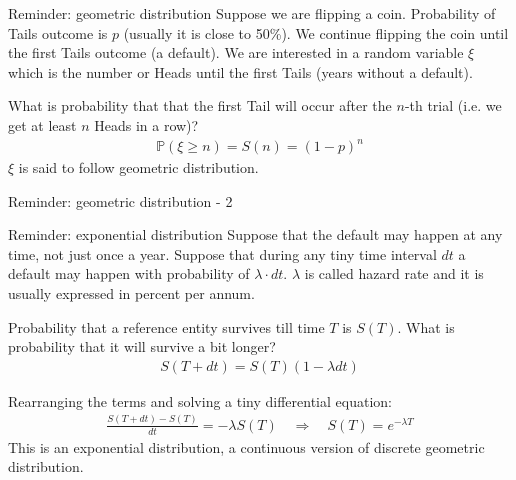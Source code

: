 \documentclass{beamer}
\begin{document}
\begin{frame}{Reminder: geometric distribution}
\justify
Suppose we are flipping a coin. Probability of Tails outcome is $p$ (usually it is close to 50\%). We continue flipping the coin until the first Tails outcome (a default). We are interested in a random variable $\xi$ which is the number or Heads until the first Tails (years without a default).

\justify
What is probability that that the first Tail will occur after the $n$-th trial (i.e. we get at least $n$ Heads in a row)?
\begin{align*}
\mathbb{P}(\xi \ge n) = S(n) = (1 - p)^{n}
\end{align*}
\justify
$\xi$ is said to follow geometric distribution.
\end{frame}



\begin{frame}{Reminder: geometric distribution - 2}
\centering
{}
\end{frame}



\begin{frame}{Reminder: exponential distribution}
\justify
Suppose that the default may happen at any time, not just once a year. Suppose that during any tiny time interval $dt$ a default may happen with probability of $\lambda \cdot dt$. $\lambda$ is called \alert{hazard rate} and it is usually expressed in percent per annum.

\justify
Probability that a reference entity survives till time $T$ is $S(T)$. What is probability that it will survive a bit longer?
\begin{align*}
S(T+dt) = S(T)(1 - \lambda dt)
\end{align*}

\justify
Rearranging the terms and solving a tiny differential equation:
\begin{align*}
\frac{S(T+dt) - S(T)}{dt} = -\lambda S(T) \quad
\Rightarrow
\quad
S(T) = e^{-\lambda T}
\end{align*}
\justify
This is an exponential distribution, a continuous version of discrete geometric distribution.
\end{frame}
\end{document}
